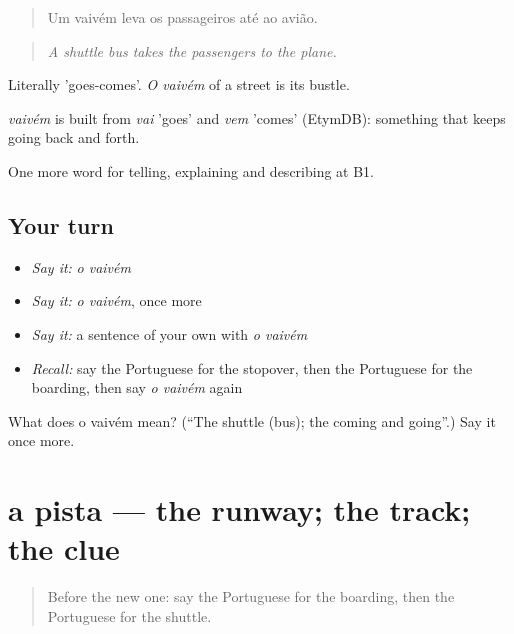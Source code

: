 \begin{quote}
Um vaivém leva os passageiros até ao avião.
\end{quote}

\begin{quote}
\emph{A shuttle bus takes the passengers to the plane.}
\end{quote}

Literally 'goes-comes'. \emph{O vaivém} of a street is its bustle.

\begin{cousinweb}
\emph{vaivém} is built from \emph{vai} 'goes' and \emph{vem} 'comes' (EtymDB): something that keeps going back and forth.
\end{cousinweb}

\begin{grammarlens}[title={What you've built}]
One more word for telling, explaining and describing at B1.
\end{grammarlens}

\subsection*{Your turn}
\begin{itemize}
\raggedright
  \item \emph{Say it:} \emph{o vaivém}
  \item \emph{Say it:} \emph{o vaivém}, once more
  \item \emph{Say it:} a sentence of your own with \emph{o vaivém}
  \item \emph{Recall:} say the Portuguese for the stopover, then the Portuguese for the boarding, then say \emph{o vaivém} again
\end{itemize}

\begin{tcolorbox}[breakable,colback=teal!4,colframe=teal!35!black,title={Before you move on}]
What does o vaivém mean? (\textquotedblleft{}The shuttle (bus); the coming and going\textquotedblright{}.) Say it once more.
\end{tcolorbox}
\section[a pista]{a pista — the runway; the track; the clue}

\label{lesson:PT-C421-pista}



\begin{quote}
Before the new one: say the Portuguese for the boarding, then the Portuguese for the shuttle.
\end{quote}

